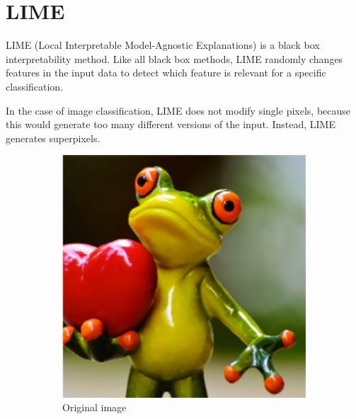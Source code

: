 \section{LIME}

LIME \cite{ribeiro2016should} (Local Interpretable Model-Agnostic Explanations) is a black box interpretability method. Like all black box methods, LIME randomly changes features in the input data to detect which feature is relevant for a specific classification.

In the case of image classification, LIME does not modify single pixels, because this would generate too many different versions of the input.
Instead, LIME generates superpixels.

\begin{figure}[H]
    \centering
    \begin{subfigure}[t]{.35\textwidth}
        \centering
        \includegraphics[width=\linewidth]{chapters/02_methods/images/frog1.png}
        \caption{Original image}
    \end{subfigure}\hspace{1.5cm}%
    \begin{subfigure}[t]{.35\textwidth}
        \centering

\end{subfigure}
\end{figure}

